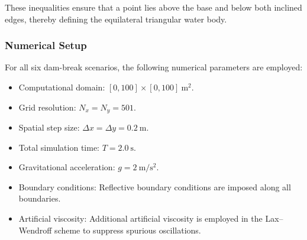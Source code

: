 \documentclass[12pt]{article}
\begin{document}
These inequalities ensure that a point lies above the base and below both inclined edges, thereby defining the equilateral triangular water body.
\begin{table}[h!]
\centering
\caption{Summary of Initial Conditions Considered in This Study}
\label{tab:initial_conditions}


\end{table}

\subsubsection{Numerical Setup}

For all six dam-break scenarios, the following numerical parameters are employed:

\begin{itemize}
\item Computational domain:
$[0,100]\times[0,100]~\mathrm{m}^2$.
\item Grid resolution:
$N_x=N_y=501$.
\item Spatial step size:
$\Delta x=\Delta y=0.2~\mathrm{m}$.
\item Total simulation time:
$T=2.0~\mathrm{s}$.
\item Gravitational acceleration:
$g=2~\mathrm{m/s^2}$.
\item Boundary conditions:
Reflective boundary conditions are imposed along all boundaries.
\item Artificial viscosity:
Additional artificial viscosity is employed in the Lax--Wendroff scheme to suppress spurious oscillations.
\end{itemize}
\end{document}
